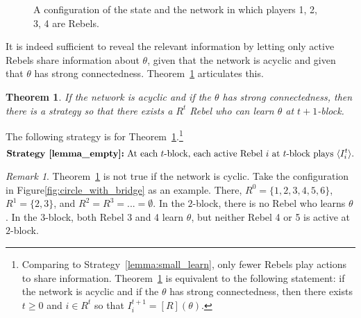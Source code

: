 \documentclass[12pt,letter]{article}
\newtheorem{theorem}{Theorem}
\newtheorem{lemma}{Lemma}[section]
\theoremstyle{definition}
\theoremstyle{remark}
\newtheorem*{remark}{Remark}
\theoremstyle{claim}
\begin{document}
\begin{figure}

\begin{center}
\end{center}
\caption{A configuration of the state and the network in which players 1, 2, 3, 4 are Rebels.}
\label{fig:T-round-4}
\end{figure}


It is indeed sufficient to reveal the relevant information by letting only active Rebels share information about $\theta$, given that the network is acyclic and given that $\theta$ has strong connectedness. Theorem~\ref{lemma_empty} articulates this.
\begin{theorem}
\label{lemma_empty}
If the network is acyclic and if the $\theta$ has strong connectedness, then there is a strategy so that there exists a $R^t$ Rebel who can learn $\theta$ at $t+1$-block.
\end{theorem}
The following strategy is for Theorem~\ref{lemma_empty}.\footnote{Comparing to Strategy~\ref{lemma:small_learn}, only fewer Rebels play actions to share information. Theorem~\ref{lemma_empty} is equivalent to the following statement: if the network is acyclic and if the $\theta$ has strong connectedness, then there exists $t\geq 0$ and $i\in R^t$ so that $I^{t+1}_i=[R](\theta)$.} 
\[\textbf{Strategy~\ref{lemma_empty}:}\text{ At each $t$-block, each active Rebel $i$ at $t$-block plays $\langle {I^t_i} \rangle$.}\] 
\begin{remark}
Theorem~\ref{lemma_empty} is not true if the network is cyclic. Take the configuration in Figure\ref{fig:circle_with_bridge} as an example. There, $R^0=\{1,2,3,4,5,6\}$, $R^1=\{2,3\}$, and $R^2=R^3=...=\emptyset$. In the $2$-block, there is no Rebel who learns $\theta$. In the $3$-block, both Rebel 3 and 4 learn $\theta$, but neither Rebel 4 or 5 is active at $2$-block.
\end{remark}
\end{document}
